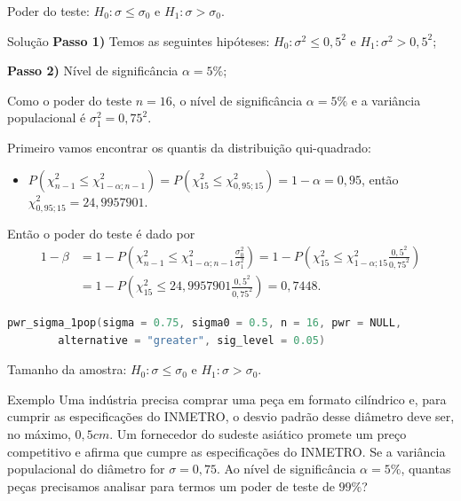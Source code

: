 \documentclass[8pt]{beamer}
\begin{document}
\begin{frame}[fragile]{Poder do teste: $H_0: \sigma \leq \sigma_0$ e $H_1: \sigma > \sigma_0$.}

\begin{block}{Solução}
	\textbf{Passo 1)} Temos as seguintes hipóteses: $H_0: \sigma^2 \leq 0,5^2$ e $H_1: \sigma^2 > 0,5^2$;
	
	\textbf{Passo 2)} Nível de significância $\alpha = 5\%$;
	
	Como o poder do teste $n=16$, o nível de significância $\alpha=5\%$ e a variância populacional é $\sigma_1^2 = 0,75^2$.
	
	Primeiro vamos encontrar os quantis da distribuição qui-quadrado:
	\begin{itemize}
		\item $P\left( \chi_{n-1}^2 \leq \chi_{1-\alpha; n-1}^2 \right) = P\left( \chi_{15}^2 \leq \chi_{0,95; 15}^2 \right) =1- \alpha = 0,95$, então $\chi_{0,95; 15}^2 = 24,9957901$.
	\end{itemize}
	
	Então o poder do teste é dado por
	\begin{align*}
	1-\beta &=1- P\left( \chi_{n-1}^2 \leq \chi_{1-\alpha; n-1}^2\frac{\sigma_0^2}{\sigma_1^2} \right) =1- P \left( \chi_{15}^2 \leq \chi_{1-\alpha; 15}^2\frac{0,5^2}{0,75^2} \right)\\ 
	&=1- P \left( \chi_{15}^2 \leq  24,9957901 \frac{0,5^2}{0,75^2} \right)= 0,7448.
	\end{align*}
\end{block}

\begin{lstlisting}[language = C, caption = Código no R.]
pwr_sigma_1pop(sigma = 0.75, sigma0 = 0.5, n = 16, pwr = NULL,
		alternative = "greater", sig_level = 0.05)
\end{lstlisting}

\end{frame}


\begin{frame}{Tamanho da amostra: $H_0: \sigma \leq \sigma_0$ e $H_1: \sigma > \sigma_0$.}

\large

\begin{block}{Exemplo}
Uma indústria precisa comprar uma peça em formato cilíndrico e, para cumprir as especificações do INMETRO, o desvio padrão desse diâmetro deve ser, no máximo, $0,5cm$. Um fornecedor do sudeste asiático promete um preço competitivo e afirma que cumpre as especificações do INMETRO. Se a variância populacional do diâmetro for $\sigma=0,75$. Ao nível de significância $\alpha=5\%$, quantas peças precisamos analisar para termos um poder de teste de $99\%$?
\end{block}

\normalsize
\end{frame}
\end{document}
